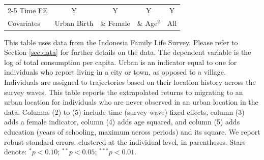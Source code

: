 \begin{table}[htbp]
\begin{threeparttable}
\begin{tabular}{l cccc}
\cmidrule{2-5} Time FE & Y & Y & Y & Y \\ Covariates & Urban Birth & \& Female & \& Age$^2$ & All \\ \bottomrule \end{tabular} \begin{tablenotes}[flushleft] \footnotesize \item{This table uses data from the Indonesia Family Life Survey. Please refer to Section \ref{sec:data} for further details on the data. The dependent variable is the log of total consumption per capita. Urban is an indicator equal to one for individuals who report living in a city or town, as opposed to a village. Individuals are assigned to trajectories based on their location history across the survey waves. This table reports the extrapolated returns to migrating to an urban location for individuals who are never observed in an urban location in the data. Columns (2) to (5) include time (survey wave) fixed effects, column (3) adds a female indicator, column (4) adds age squared, and column (5) adds education (years of schooling, maximum across periods) and its square. We report robust standard errors, clustered at the individual level, in parentheses. Stars denote: $^{*} p<0.10$; $^{**} p<0.05$; $^{***} p<0.01$.} \end{tablenotes} \end{threeparttable} \end{table}
